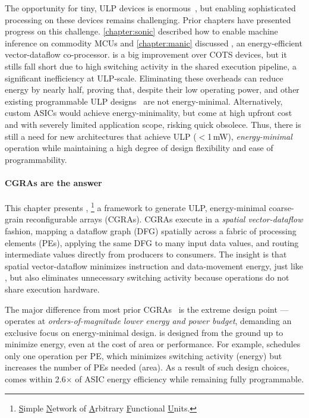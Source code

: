The opportunity for tiny, ULP devices is enormous~\cite{lucia2017intermittent}, but enabling sophisticated processing on these devices remains challenging.
% 
Prior chapters have presented progress on this challenge.
% 
\autoref{chapter:sonic} described how to enable machine inference on commodity MCUs and \autoref{chapter:manic} discussed \manic, an energy-efficient vector-dataflow co-processor.
% 
\manic is a big improvement over COTS devices, but it stills fall short due to high switching activity
in the shared execution pipeline, a significant inefficiency at ULP-scale.
% 
Eliminating these overheads can reduce energy by nearly half, proving that, despite their low operating power, \manic and other existing programmable ULP designs~\cite{dally:ieee08:elm,hempstead2005ultra,warneke200417,nazhandali2005energy} are not energy-minimal.
% 
Alternatively, custom ASICs would achieve energy-minimality, but come at high upfront cost~\cite{hotmobile2021} and with severely limited application scope, risking quick obsolece.
% 
Thus, there is still a need for new architectures that achieve ULP ($<$1\,mW), \emph{energy-minimal} operation while maintaining a high degree of design flexibility and ease of programmability.

\paragraph{\Ulp CGRAs are the answer}
%
This chapter presents \snafuframe,%
\footnote{\underline{S}imple \underline{N}etwork of \underline{A}rbitrary \underline{F}unctional \underline{U}nits.}
a framework to generate ULP, energy-minimal coarse-grain reconfigurable arrays (CGRAs).
%
\snafuframe CGRAs execute in a \emph{spatial vector-dataflow} fashion,
mapping a dataflow graph (DFG) spatially across a fabric of processing elements (PEs),
applying the same DFG to many input data values,
and routing intermediate values directly from producers to consumers.
%
The insight is that spatial vector-dataflow minimizes instruction and data-movement energy, just like \manic,
but also eliminates unnecessary switching activity because operations do not share execution hardware.

The major difference from most prior CGRAs~\cite{plasticine,dyser,nowatzki:isca17:stream-dataflow,goldstein2000piperench,trips,weng2020dsagen,weng2020hybrid,voitsechov2014single,mishra2006tartan,tan2018stitch,karunaratne2017hycube,voitsechov2018inter,evx} is the extreme design point
--- \snafuframe operates at \emph{orders-of-magnitude lower energy and power budget},
demanding an exclusive focus on energy-minimal design.
%
\snafuframe is designed from the ground up to minimize energy, even at
the cost of area or performance.
%
For example, \snafuframe schedules only one operation per PE, which
minimizes switching activity (energy) but increases the number of PEs needed (area).
%
As a result of such design choices, \snafuframe comes within 2.6$\times$
of ASIC energy efficiency while remaining fully programmable.
%

